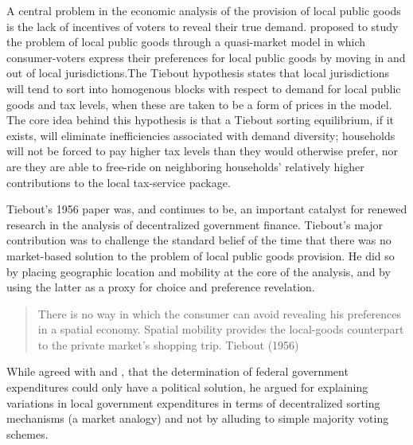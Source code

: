 A central problem in the economic analysis of the provision of local
public goods is the lack of incentives of voters to reveal their true
demand. \citet{tiebout_pure_1956} proposed to study the problem of
local public goods through a quasi-market model in which
consumer-voters express their preferences for local public goods by
moving in and out of local jurisdictions.The Tiebout hypothesis states
that local jurisdictions will tend to sort into homogenous blocks with
respect to demand for local public goods and tax levels, when these
are taken to be a form of prices in the model. The core idea behind
this hypothesis is that a Tiebout sorting equilibrium, if it exists,
will eliminate inefficiencies associated with demand diversity;
households will not be forced to pay higher tax levels than they would
otherwise prefer, nor are they are able to free-ride on neighboring
households' relatively higher contributions to the local tax-service
package.

Tiebout's 1956 paper was, and continues to be, an important catalyst
for renewed research in the analysis of decentralized government
finance. Tiebout's major contribution was to challenge the standard
belief of the time that there was no market-based solution to the
problem of local public goods provision. He did so by placing
geographic location and mobility at the core of the analysis, and by
using the latter as a proxy for choice and preference revelation.

\begin{quote}
There is no way in which the consumer can avoid revealing his
preferences in a spatial economy. Spatial mobility provides the
local-goods counterpart to the private market's shopping trip.
Tiebout (1956)
\end{quote}

While \citet{tiebout_pure_1956} agreed with
\citet{musgrave_voluntary_1939} and \citet{samuelson_pure_1954}, that
the determination of federal government expenditures could only have a
political solution, he argued for explaining variations in local
government expenditures in terms of decentralized sorting mechanisms
(a market analogy) and not by alluding to simple majority voting
schemes.

